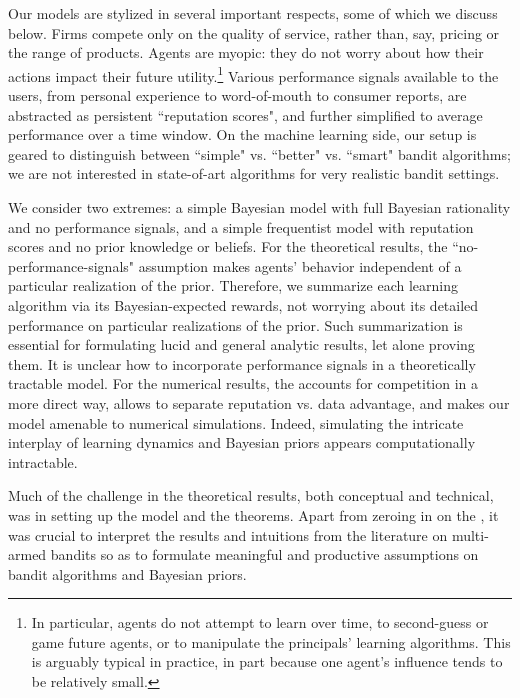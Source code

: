 Our models are stylized in several important  respects, some of which we discuss below. Firms compete only on the quality of service, rather than, say, pricing or the range of products. Agents are myopic: they do not worry about how their actions impact their future utility.\footnote{In particular, agents do not attempt to learn over time, to second-guess or game future agents, or to manipulate the principals' learning algorithms. This is arguably typical in practice, in part because one agent's influence tends to be relatively small.}  Various performance signals available to the users, from personal experience to word-of-mouth to consumer reports, are abstracted as persistent ``reputation scores", and further simplified to average performance over a time window. On the machine learning side, our setup is geared to distinguish between ``simple" vs. ``better" vs. ``smart" bandit algorithms; we are not interested in state-of-art algorithms for very realistic bandit settings.



We consider two extremes: a simple Bayesian model with full Bayesian rationality and no performance signals, and a simple frequentist model with reputation scores and no prior knowledge or beliefs. For the theoretical results, the ``no-performance-signals" assumption makes agents' behavior independent of a particular realization of the prior. Therefore, we summarize each learning algorithm via its Bayesian-expected rewards, not worrying about its detailed performance on particular realizations of the prior. Such summarization is essential for formulating lucid and general analytic results, let alone proving them. It is unclear how to incorporate performance signals in a theoretically tractable model. For the numerical results, the \ExptsModel accounts for competition in a more direct way, allows to separate reputation vs. data advantage, and makes our model amenable to numerical simulations. Indeed, simulating the intricate interplay of learning dynamics and Bayesian priors appears computationally intractable.

Much of the challenge in the theoretical results, both conceptual and technical, was in setting up the model and the theorems. Apart from zeroing in on the \TheoryModel, it was crucial to interpret the results and intuitions from the literature on multi-armed bandits so as to formulate meaningful and productive assumptions on bandit algorithms and Bayesian priors.

